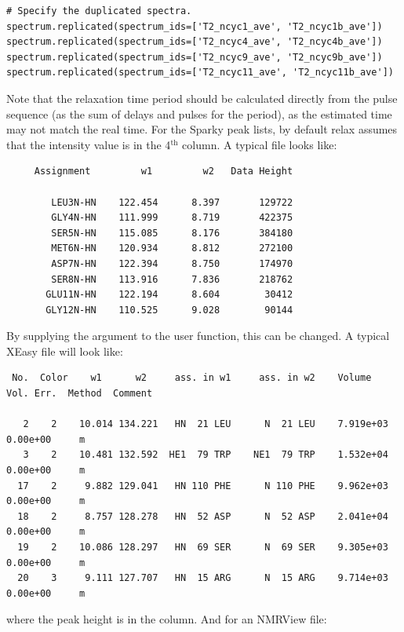 \begin{lstlisting}[firstnumber=47]
# Specify the duplicated spectra.
spectrum.replicated(spectrum_ids=['T2_ncyc1_ave', 'T2_ncyc1b_ave'])
spectrum.replicated(spectrum_ids=['T2_ncyc4_ave', 'T2_ncyc4b_ave'])
spectrum.replicated(spectrum_ids=['T2_ncyc9_ave', 'T2_ncyc9b_ave'])
spectrum.replicated(spectrum_ids=['T2_ncyc11_ave', 'T2_ncyc11b_ave'])
\end{lstlisting}

Note that the relaxation time period should be calculated directly from the pulse sequence (as the sum of delays and pulses for the period), as the estimated time may not match the real time.
For the Sparky peak lists, by default relax assumes that the intensity value is in the 4$^{\textrm{th}}$ column.
A typical file looks like:

{\scriptsize \begin{verbatim}
     Assignment         w1         w2   Data Height

        LEU3N-HN    122.454      8.397       129722
        GLY4N-HN    111.999      8.719       422375
        SER5N-HN    115.085      8.176       384180
        MET6N-HN    120.934      8.812       272100
        ASP7N-HN    122.394      8.750       174970
        SER8N-HN    113.916      7.836       218762
       GLU11N-HN    122.194      8.604        30412
       GLY12N-HN    110.525      9.028        90144
\end{verbatim}}

By supplying the  argument to the  user function, this can be changed.
A typical XEasy file will look like:

{\scriptsize \begin{verbatim}
 No.  Color    w1      w2     ass. in w1     ass. in w2    Volume     Vol. Err.  Method  Comment

   2    2    10.014 134.221   HN  21 LEU      N  21 LEU    7.919e+03  0.00e+00     m
   3    2    10.481 132.592  HE1  79 TRP    NE1  79 TRP    1.532e+04  0.00e+00     m
  17    2     9.882 129.041   HN 110 PHE      N 110 PHE    9.962e+03  0.00e+00     m
  18    2     8.757 128.278   HN  52 ASP      N  52 ASP    2.041e+04  0.00e+00     m
  19    2    10.086 128.297   HN  69 SER      N  69 SER    9.305e+03  0.00e+00     m
  20    3     9.111 127.707   HN  15 ARG      N  15 ARG    9.714e+03  0.00e+00     m
\end{verbatim}}

where the peak height is in the  column.
And for an NMRView file:

